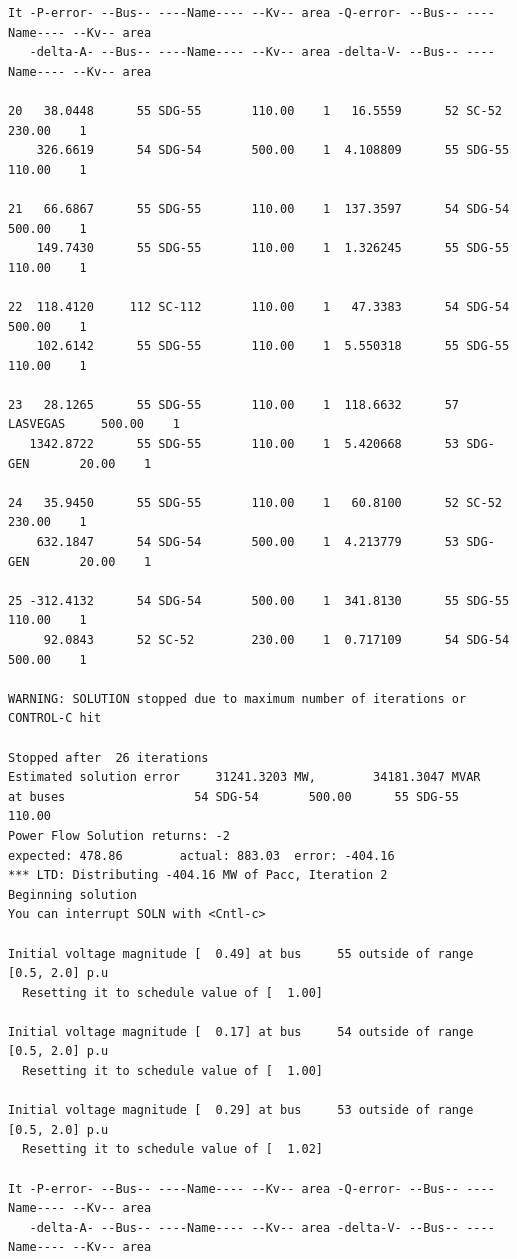 \documentclass[12pt]{article}
\begin{document}
\begin{Verbatim}
It -P-error- --Bus-- ----Name---- --Kv-- area -Q-error- --Bus-- ----Name---- --Kv-- area
   -delta-A- --Bus-- ----Name---- --Kv-- area -delta-V- --Bus-- ----Name---- --Kv-- area

20   38.0448      55 SDG-55       110.00    1   16.5559      52 SC-52        230.00    1
    326.6619      54 SDG-54       500.00    1  4.108809      55 SDG-55       110.00    1

21   66.6867      55 SDG-55       110.00    1  137.3597      54 SDG-54       500.00    1
    149.7430      55 SDG-55       110.00    1  1.326245      55 SDG-55       110.00    1

22  118.4120     112 SC-112       110.00    1   47.3383      54 SDG-54       500.00    1
    102.6142      55 SDG-55       110.00    1  5.550318      55 SDG-55       110.00    1

23   28.1265      55 SDG-55       110.00    1  118.6632      57 LASVEGAS     500.00    1
   1342.8722      55 SDG-55       110.00    1  5.420668      53 SDG-GEN       20.00    1

24   35.9450      55 SDG-55       110.00    1   60.8100      52 SC-52        230.00    1
    632.1847      54 SDG-54       500.00    1  4.213779      53 SDG-GEN       20.00    1

25 -312.4132      54 SDG-54       500.00    1  341.8130      55 SDG-55       110.00    1
     92.0843      52 SC-52        230.00    1  0.717109      54 SDG-54       500.00    1

WARNING: SOLUTION stopped due to maximum number of iterations or CONTROL-C hit

Stopped after  26 iterations
Estimated solution error     31241.3203 MW,        34181.3047 MVAR
at buses                  54 SDG-54       500.00      55 SDG-55       110.00 
Power Flow Solution returns: -2
expected: 478.86        actual: 883.03  error: -404.16
*** LTD: Distributing -404.16 MW of Pacc, Iteration 2
Beginning solution
You can interrupt SOLN with <Cntl-c>

Initial voltage magnitude [  0.49] at bus     55 outside of range [0.5, 2.0] p.u
  Resetting it to schedule value of [  1.00]

Initial voltage magnitude [  0.17] at bus     54 outside of range [0.5, 2.0] p.u
  Resetting it to schedule value of [  1.00]

Initial voltage magnitude [  0.29] at bus     53 outside of range [0.5, 2.0] p.u
  Resetting it to schedule value of [  1.02]

It -P-error- --Bus-- ----Name---- --Kv-- area -Q-error- --Bus-- ----Name---- --Kv-- area
   -delta-A- --Bus-- ----Name---- --Kv-- area -delta-V- --Bus-- ----Name---- --Kv-- area


\end{Verbatim}
\end{document}

